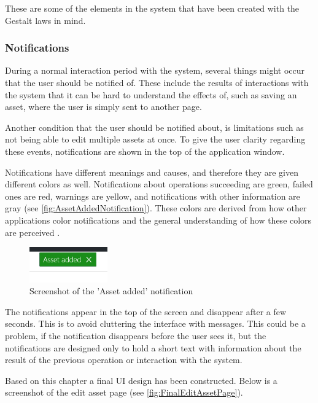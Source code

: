 These are some of the elements in the system that have been created with the Gestalt laws in mind.

\subsubsection*{Notifications}
During a normal interaction period with the system, several things might occur that the user should be notified of. These include the results of interactions with the system that it can be hard to understand the effects of, such as saving an asset, where the user is simply sent to another page. \par
Another condition that the user should be notified about, is limitations such as not being able to edit multiple assets at once. To give the user clarity regarding these events, notifications are shown in the top of the application window.
\par
Notifications have different meanings and causes, and therefore they are given different colors as well. Notifications about operations succeeding are green, failed ones are red, warnings are yellow, and notifications with other information are gray (see \autoref{fig:AssetAddedNotification}). These colors are derived from how other applications color notifications and the general understanding of how these colors are perceived \citep{ColorTheory}\citep[Page 277]{DEB}.

\begin{figure}[H]
    \centering
    \includegraphics[width=0.3\textwidth]{figures/UIDesignElements/GreenNotification.png}
    \caption{Screenshot of the 'Asset added' notification}
    \label{fig:AssetAddedNotification}
\end{figure}

The notifications appear in the top of the screen and disappear after a few seconds. This is to avoid cluttering the interface with messages. This could be a problem, if the notification disappears before the user sees it, but the notifications are designed only to hold a short text with information about the result of the previous operation or interaction with the system.
\par
Based on this chapter a final UI design has been constructed. Below is a screenshot of the edit asset page (see \autoref{fig:FinalEditAssetPage}).

